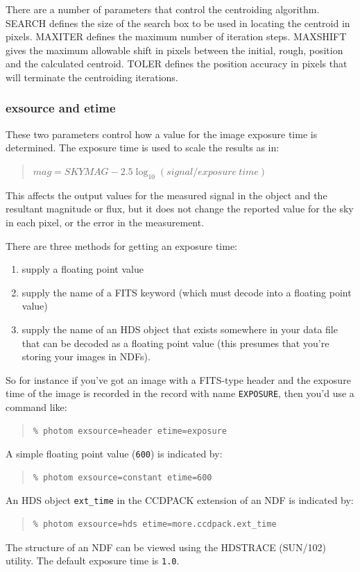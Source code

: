 \documentclass[twoside,11pt]{article}
\newcommand{\xref}[3]{#1}
\renewcommand{\_}{\texttt{\symbol{95}}}
\begin{document}
There are a number of parameters that control the centroiding algorithm.
SEARCH defines the size of the search box to be used in locating the
centroid in pixels. MAXITER defines the maximum number of iteration steps.
MAXSHIFT gives the maximum allowable shift in pixels between the initial,
rough, position and the calculated centroid. TOLER defines the position
accuracy in pixels that will terminate the centroiding iterations.

\subsubsection{exsource and etime}

These two parameters control how a value for the image exposure time
is determined. The exposure time is used to scale the results as in:
\begin{quote}
$mag = SKYMAG - 2.5 \log_{10} ( signal / exposure~time)$
\end{quote}
This affects the output values for the measured signal in the object
and the resultant magnitude or flux, but it does not change the
reported value for the sky in each pixel, or the error in the
measurement.

There are three methods for getting an exposure time:
\begin{enumerate}
\item supply a floating point value
\item supply the name of a FITS keyword (which must decode into a
  floating point value)
\item supply the name of an HDS object that exists somewhere in your
data file that can be decoded as a floating point value (this presumes
that you're storing your images in NDFs).
\end{enumerate}

So for instance if you've got an image with a FITS-type header and
the exposure time of the image is recorded in the record with name
\verb+EXPOSURE+, then you'd use a command like:
\begin{quote}
\begin{verbatim}
% photom exsource=header etime=exposure
\end{verbatim}
\end{quote}
A simple floating point value (\verb+600+) is indicated by:
\begin{quote}
\begin{verbatim}
% photom exsource=constant etime=600
\end{verbatim}
\end{quote}
An HDS object \verb+ext_time+ in the CCDPACK extension of an NDF is
indicated by:
\begin{quote}
\begin{verbatim}
% photom exsource=hds etime=more.ccdpack.ext_time
\end{verbatim}
\end{quote}
The structure of an NDF can be viewed using the HDSTRACE
(\xref{SUN/102}{sun102}{}) utility. The default exposure time is
\verb+1.0+.
\end{document}
